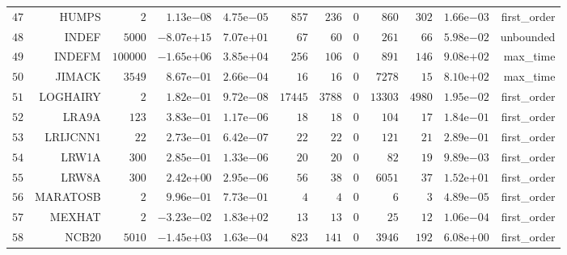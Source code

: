 \begin{longtable}{rrrrrrrrrrrr}
  \(    47\) & HUMPS & \(     2\) & \( 1.13\)e\(-08\) & \( 4.75\)e\(-05\) & \(   857\) & \(   236\) & \(     0\) & \(   860\) & \(   302\) & \( 1.66\)e\(-03\) & first\_order \\
  \(    48\) & INDEF & \(  5000\) & \(-8.07\)e\(+15\) & \( 7.07\)e\(+01\) & \(    67\) & \(    60\) & \(     0\) & \(   261\) & \(    66\) & \( 5.98\)e\(-02\) & unbounded \\
  \(    49\) & INDEFM & \(100000\) & \(-1.65\)e\(+06\) & \( 3.85\)e\(+04\) & \(   256\) & \(   106\) & \(     0\) & \(   891\) & \(   146\) & \( 9.08\)e\(+02\) & max\_time \\
  \(    50\) & JIMACK & \(  3549\) & \( 8.67\)e\(-01\) & \( 2.66\)e\(-04\) & \(    16\) & \(    16\) & \(     0\) & \(  7278\) & \(    15\) & \( 8.10\)e\(+02\) & max\_time \\
  \(    51\) & LOGHAIRY & \(     2\) & \( 1.82\)e\(-01\) & \( 9.72\)e\(-08\) & \( 17445\) & \(  3788\) & \(     0\) & \( 13303\) & \(  4980\) & \( 1.95\)e\(-02\) & first\_order \\
  \(    52\) & LRA9A & \(   123\) & \( 3.83\)e\(-01\) & \( 1.17\)e\(-06\) & \(    18\) & \(    18\) & \(     0\) & \(   104\) & \(    17\) & \( 1.84\)e\(-01\) & first\_order \\
  \(    53\) & LRIJCNN1 & \(    22\) & \( 2.73\)e\(-01\) & \( 6.42\)e\(-07\) & \(    22\) & \(    22\) & \(     0\) & \(   121\) & \(    21\) & \( 2.89\)e\(-01\) & first\_order \\
  \(    54\) & LRW1A & \(   300\) & \( 2.85\)e\(-01\) & \( 1.33\)e\(-06\) & \(    20\) & \(    20\) & \(     0\) & \(    82\) & \(    19\) & \( 9.89\)e\(-03\) & first\_order \\
  \(    55\) & LRW8A & \(   300\) & \( 2.42\)e\(+00\) & \( 2.95\)e\(-06\) & \(    56\) & \(    38\) & \(     0\) & \(  6051\) & \(    37\) & \( 1.52\)e\(+01\) & first\_order \\
  \(    56\) & MARATOSB & \(     2\) & \( 9.96\)e\(-01\) & \( 7.73\)e\(-01\) & \(     4\) & \(     4\) & \(     0\) & \(     6\) & \(     3\) & \( 4.89\)e\(-05\) & first\_order \\
  \(    57\) & MEXHAT & \(     2\) & \(-3.23\)e\(-02\) & \( 1.83\)e\(+02\) & \(    13\) & \(    13\) & \(     0\) & \(    25\) & \(    12\) & \( 1.06\)e\(-04\) & first\_order \\
  \(    58\) & NCB20 & \(  5010\) & \(-1.45\)e\(+03\) & \( 1.63\)e\(-04\) & \(   823\) & \(   141\) & \(     0\) & \(  3946\) & \(   192\) & \( 6.08\)e\(+00\) & first\_order \\

\end{longtable}
